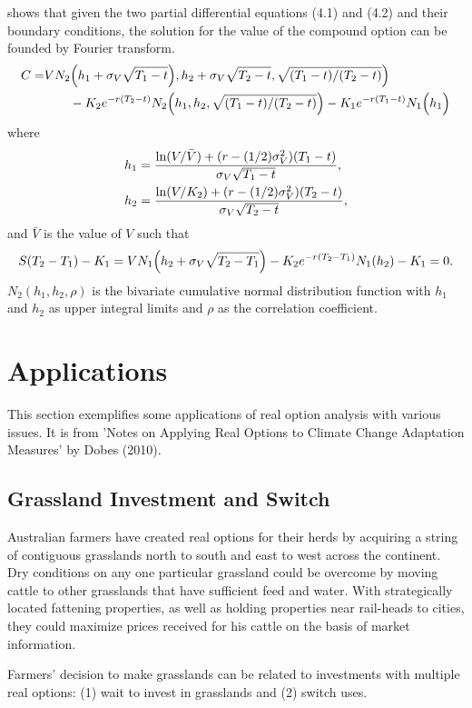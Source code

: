 \documentclass[11pt,letter]{article}
\theoremstyle{definition}
\theoremstyle{remark}
\numberwithin{equation}{section}
\begin{document}
\cite{geske1979valuation} shows that given the two partial differential equations (4.1) and (4.2) and their boundary conditions, the solution for the value of the compound option can be founded by Fourier transform.
\begin{align}
    \begin{aligned}
    C=&VN_2\Big(h_1+\sigma_V\sqrt{T_1-t}\Big),h_2+\sigma_V\sqrt{T_2-t},\sqrt{(T_1-t)/(T_2-t)}\Big)\\
      &~~~~~~-K_2e^{-r(T_2-t)}N_2\Big(h_1,h_2,\sqrt{(T_1-t)/(T_2-t)}\Big)-K_1e^{-r(T_1-t)}N_1\Big(h_1\Big)
    \end{aligned}
\end{align}
where
\begin{align*}
    h_1&=\frac{\ln(V/\bar{V})+(r-(1/2)\sigma_V^2)(T_1-t)}{\sigma_V\sqrt{T_1-t}},\\
    h_2&=\frac{\ln(V/K_2)+(r-(1/2)\sigma_V^2)(T_2-t)}{\sigma_V\sqrt{T_2-t}},
\end{align*}
and $\bar{V}$ is the value of $V$ such that 
\begin{align*}
    S(T_2-T_1)-K_1=VN_1\Big(h_2+\sigma_V\sqrt{T_2-T_1}\Big)-K_2e^{-r(T_2-T_1)}N_1(h_2)-K_1=0.
\end{align*}
$N_2(h_1,h_2,\rho)$ is the bivariate cumulative normal distribution function with $h_1$ and $h_2$ as upper integral limits and $\rho$ as the correlation coefficient.


\section{Applications}
This section exemplifies some applications of real option analysis with various issues. It is from 'Notes on Applying Real Options to Climate Change Adaptation Measures' by Dobes (2010).

\subsection{Grassland Investment and Switch}
Australian farmers have created real options for their herds by acquiring a string of contiguous grasslands north to south and east to west across the continent. Dry conditions on any one particular grassland could be overcome by moving cattle to other grasslands that have sufficient feed and water.  With strategically located fattening properties, as well as holding properties near rail-heads to cities, they could maximize prices received for his cattle on the basis of market information.

Farmers' decision to make grasslands can be related to investments with multiple real options: (1) wait to invest in grasslands and (2) switch uses.
\end{document}
